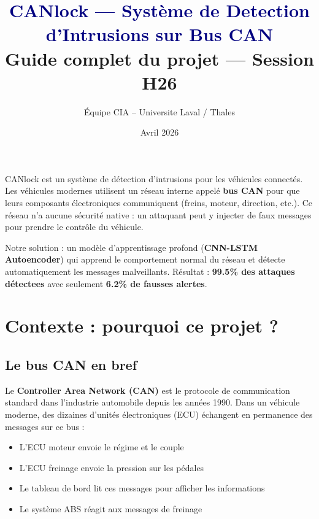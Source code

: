 \documentclass[12pt,a4paper]{article}
\title{\textcolor{navy}{\textbf{CANlock --- Système de Detection d'Intrusions sur Bus CAN}}\\[0.5em]
\large Guide complet du projet --- Session H26}
\author{Équipe CIA -- Universite Laval / Thales}
\date{Avril 2026}
\begin{document}
\maketitle

\begin{tcolorbox}[colback=navy!5, colframe=navy, title=\textbf{Résumé en 30 secondes}]
CANlock est un système de détection d'intrusions pour les véhicules connectés. Les véhicules modernes utilisent un réseau interne appelé \textbf{bus CAN} pour que leurs composants électroniques communiquent (freins, moteur, direction, etc.). Ce réseau n'a aucune sécurité native : un attaquant peut y injecter de faux messages pour prendre le contrôle du véhicule.

Notre solution : un modèle d'apprentissage profond (\textbf{CNN-LSTM Autoencoder}) qui apprend le comportement normal du réseau et détecte automatiquement les messages malveillants. Résultat : \textbf{99.5\% des attaques détectees} avec seulement \textbf{6.2\% de fausses alertes}.
\end{tcolorbox}

\tableofcontents
\newpage

\section{Contexte : pourquoi ce projet ?}

\subsection{Le bus CAN en bref}

Le \textbf{Controller Area Network (CAN)} est le protocole de communication standard dans l'industrie automobile depuis les années 1990. Dans un véhicule moderne, des dizaines d'unités électroniques (ECU) échangent en permanence des messages sur ce bus :

\begin{itemize}[noitemsep]
    \item L'ECU moteur envoie le régime et le couple
    \item L'ECU freinage envoie la pression sur les pédales
    \item Le tableau de bord lit ces messages pour afficher les informations
    \item Le système ABS réagit aux messages de freinage
\end{itemize}
\end{document}
